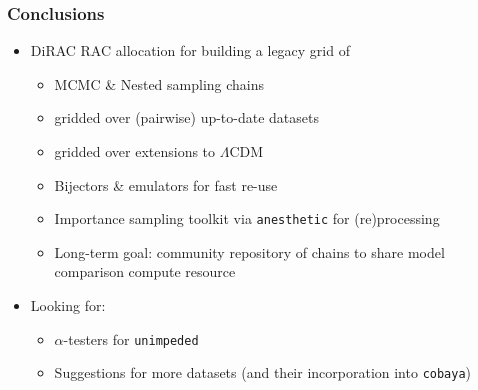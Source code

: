 \documentclass[aspectratio=169]{beamer}
\begin{document}
\begin{frame}
    \frametitle{Conclusions}
    \begin{itemize}
        \item DiRAC RAC allocation for building a legacy grid of
            \begin{itemize}
                \item MCMC \& Nested sampling chains
                \item gridded over (pairwise) up-to-date datasets
                \item gridded over extensions to $\Lambda$CDM
                \item Bijectors \& emulators for fast re-use
                \item Importance sampling toolkit via \texttt{anesthetic} for (re)processing
                \item Long-term goal: community repository of chains to share model comparison compute resource
            \end{itemize}
        \item Looking for:
            \begin{itemize}
                \item $\alpha$-testers for \texttt{unimpeded}
                \item Suggestions for more datasets (and their incorporation into \texttt{cobaya})
            \end{itemize}
    \end{itemize}
\end{frame}
\end{document}
